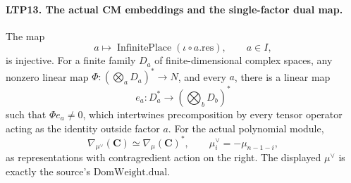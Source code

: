 \paragraph{LTP13. The actual CM embeddings and the single-factor dual map.}
\label{claim:LTP13}
The map
\[
       a\longmapsto\operatorname{InfinitePlace}
                       (\iota\circ a.\mathrm{res}),\qquad a\in I,
\]
is injective.  For a finite family \(D_a\) of finite-dimensional
complex spaces, any nonzero linear map
\(\Phi:(\bigotimes_aD_a)^*\to N\), and every \(a\), there is a
linear map
\[
                 e_a:D_a^*\longrightarrow(\bigotimes_bD_b)^*
\]
such that \(\Phi e_a\ne0\), which intertwines precomposition by
every tensor operator acting as the identity outside factor \(a\).
For the actual polynomial module,
\[
 \nabla_{\mu^\vee}(\mathbf C)
       \simeq\nabla_\mu(\mathbf C)^*,\qquad
              \mu^\vee_i=-\mu_{n-1-i},
\]
as representations with contragredient action on the right.
The displayed \(\mu^\vee\) is exactly the source's
\(\mathrm{DomWeight.dual}\).
